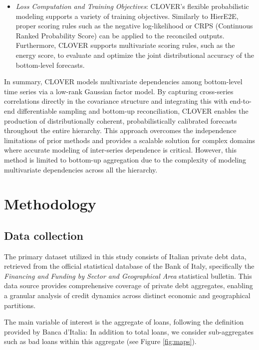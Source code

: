 \documentclass[letterpaper]{article}
\begin{document}
\begin{itemize}
\item \textit{Loss Computation and Training Objectives}: CLOVER’s flexible probabilistic modeling supports a variety of training objectives. 
Similarly to HierE2E, proper scoring rules such as the negative log-likelihood or CRPS (Continuous Ranked Probability Score) can be applied to the reconciled outputs. 
Furthermore, CLOVER supports multivariate scoring rules, such as the energy score, to evaluate and optimize the joint distributional accuracy of the bottom-level forecasts.
\end{itemize}

In summary, CLOVER models multivariate dependencies among bottom-level time series via a low-rank Gaussian factor model. 
By capturing cross-series correlations directly in the covariance structure and integrating this with end-to-end differentiable sampling and bottom-up reconciliation, CLOVER enables the production of distributionally coherent, probabilistically calibrated forecasts throughout the entire hierarchy. 
This approach overcomes the independence limitations of prior methods and provides a scalable solution for complex domains where accurate modeling of inter-series dependence is critical. 
However, this method is limited to bottom-up aggregation due to the complexity of modeling multivariate dependencies across all the hierarchy. 

\section{Methodology}
\subsection{Data collection}

The primary dataset utilized in this study consists of Italian private debt data, retrieved from the official statistical database of the Bank of Italy, specifically the \textit{Financing and Funding by Sector and Geographical Area} statistical bulletin. 
This data source provides comprehensive coverage of private debt aggregates, enabling a granular analysis of credit dynamics across distinct economic and geographical partitions.

The main variable of interest is the aggregate of loans, following the definition provided by Banca d'Italia: 
In addition to total loans, we consider sub-aggregates such as bad loans within this aggregate (see Figure \ref{fig:maps}).
\end{document}
